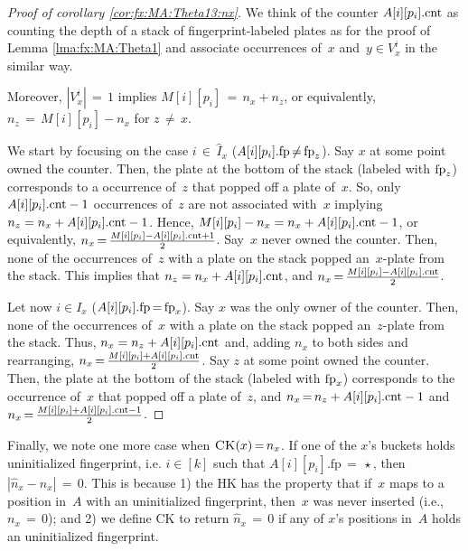 \begin{proof}[Proof of corollary \ref{cor:fx:MA:Theta13:nx}]
	We think of the counter $A[i][p_i].\textup{cnt}$ as counting the depth of a stack of fingerprint-labeled plates as for the proof of Lemma \ref{lma:fx:MA:Theta1} and associate occurrences of~$x$ and~$y \in V_x^i$ in the similar way.

	Moreover, $|V_x^i|\,{=}\,1$ implies $M[i][p_i]\,{=}\,n_x + n_z$, or equivalently,
	$\allowbreak n_z\,{=}\,M[i][p_i]-n_x$ for $z \,{\not=}\, x$.
	
	We start by focusing on the case $i \,{\in}\, \hat{I}_x$ ($A[i][p_i].\textup{fp}\,{\not=}\,\textup{fp}_z$).
	Say $x$ at some point owned the counter. 
	Then, the plate at the bottom of the stack (labeled with $\textup{fp}_z$) corresponds to a occurrence of~$z$ that popped off a plate of~$x$. So, only $A[i][p_i].\textup{cnt} - 1$ occurrences of~$z$ are not associated with~$x$ implying $n_z = n_x + A[i][p_i].\textup{cnt} - 1$. Hence, $M[i][p_i]-n_x = n_x + A[i][p_i].\textup{cnt} - 1$, or equivalently, $n_x \,{=}\, \frac{M[i][p_i]-A[i][p_i].\textup{cnt} + 1}{2}$.
	Say~$x$ never owned the counter. Then, none of the occurrences of~$z$ with a plate on the stack popped an~$x$-plate from the stack. This implies that $n_z = n_x + A[i][p_i].\textup{cnt} $, and $n_x \,{=}\, \frac{M[i][p_i]-A[i][p_i].\textup{cnt}}{2}$.
	
	Let now $i \in I_x$ ($A[i][p_i].\textup{fp}\,{=}\,\textup{fp}_x$). 
	Say $x$ was the only owner of the counter. Then, none of the occurrences of~$x$ with a plate on the stack popped an~$z$-plate from the stack.  Thus, $n_x = n_z + A[i][p_i].\textup{cnt} $ and, adding $n_x$ to both sides and rearranging, $n_x \,{=}\, \frac{M[i][p_i]+A[i][p_i].\textup{cnt}}{2}$.
	Say $z$ at some point owned the counter. Then, the plate at the bottom of the stack (labeled with $\textup{fp}_x$) corresponds to the occurrence of~$x$ that popped off a plate of~$z$, and 
	$n_x \,{=}\, n_z + A[i][p_i].\textup{cnt} - 1$ and $n_x \,{=}\, \frac{M[i][p_i]+A[i][p_i].\textup{cnt} - 1}{2}$.
\end{proof}


Finally, we note one more case when $\textnormal{\textsc{CK}}(x)\,{=}\,n_x$. 
If one of the $x$'s buckets holds uninitialized fingerprint, i.e. $i \in [k]$ such that $A[i][p_i].\mathrm{fp}\,{=}\,\star$, then $|\hat{n}_{x} - n_{x}|\,{=}\,0$.
This is because 1) the HK has the property that if~$x$ maps to a position in~$A$ with an uninitialized fingerprint, then~$x$ was never inserted (i.e., $n_x\,{=}\,0$); and 2) we define CK to return $\hat{n}_x\,{=}\,0$ if any of $x$'s positions in~$A$ holds an uninitialized fingerprint. 
